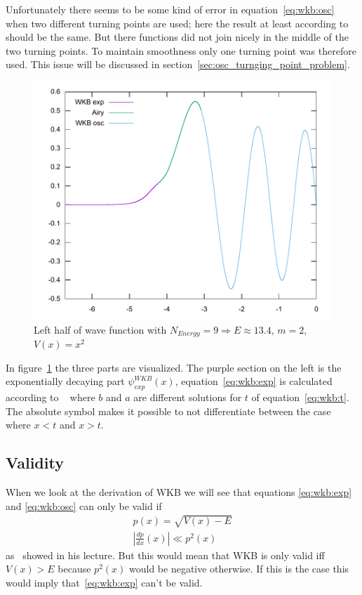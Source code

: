 \documentclass[11pt,DIV=10,final]{scrreprt} %
\begin{document}
Unfortunately there seems to be some kind of error in equation~\ref{eq:wkb:osc} when two different turning points are used; here the result at least according to~\cite{hall2013quantum} should be the same.
But there functions did not join nicely in the middle of the two turning points. To maintain smoothness only one turning point was therefore used. This issue will be discussed in
section~\ref{sec:osc_turnging_point_problem}.

\begin{figure}[H]
  \centering
  \includegraphics[width=.9\textwidth]{plots/square9half.pdf}
  \caption{Left half of wave function with $N_{Energy} = 9 \Rightarrow E \approx 13.4$, $m = 2$, $V(x) = x^{2}$}\label{fig:wave_parts}
\end{figure}
In figure~\ref{fig:wave_parts} the three parts are visualized. The purple section on the left is the exponentially decaying part $\psi^{WKB}_{exp} (x)$, equation~\ref{eq:wkb:exp} is calculated according to
~\cite[p. 317, Claim 15.7]{hall2013quantum} where $b$ and $a$ are different solutions for $t$ of equation~\ref{eq:wkb:t}. The absolute symbol makes it possible to not
differentiate between the case where $x < t$ and $x > t$.
\subsection{Validity}
When we look at the derivation of WKB we will see that equations \ref{eq:wkb:exp} and \ref{eq:wkb:osc} can only be valid if
\begin{align*}
  p(x) = \sqrt{V(x) - E} \\
  \left|\frac{dp}{dx}(x)\right| \ll p^{2}(x)
\end{align*}
as~\cite{zwiebach2018lecture} showed in his lecture.
But this would mean that WKB is only valid iff $V(x) > E$ because $p^{2}(x)$ would be negative otherwise.
If this is the case this would imply that~\ref{eq:wkb:exp} can't be valid.
\end{document}
